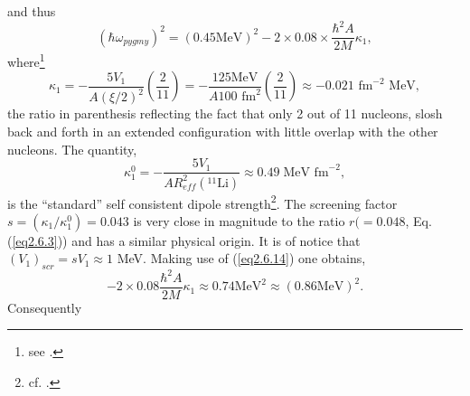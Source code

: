  and thus
\begin{equation}
 (\hbar\omega_{pygmy})^2=(0.45 \text{MeV})^2-2\times 0.08\times\frac{\hbar^2A}{2M}\kappa_1,
\end{equation}
 where\footnote{see \cite{Bortignon:98}.}
\begin{equation}\label{eq2.6.14}
\kappa_1=-\frac{5V_1}{A(\xi/2)^2}\left(\frac{2}{11}\right)=-\frac{125\text{MeV}}{A 100 \text{ fm}^2}\left(\frac{2}{11}\right)\approx -0.021\text{ fm}^{-2}\text{ MeV},
\end{equation}
the ratio in parenthesis reflecting the fact that only 2 out of 11 nucleons, slosh back and forth in an extended configuration with little overlap with the other nucleons. The quantity,
\begin{equation}\label{eq2.6.21}
\kappa_1^0=-\frac{5V_1}{AR^2_{eff}(^{11}\text{Li})}\approx 0.49\; \text{MeV fm}^{-2},
\end{equation}
is the ``standard'' self consistent dipole strength\footnote{cf. \cite{Bohr:75}.}. The screening factor $s=(\kappa_1/\kappa_1^0)=0.043$ is very close in magnitude to the ratio $r(=0.048$, Eq. (\ref{eq2.6.3})) and has a similar physical origin. It is of notice that $(V_1)_{scr}=sV_1\approx 1$ MeV. Making use of (\ref{eq2.6.14})  one obtains,
\begin{equation}
-2\times 0.08\frac{\hbar^2A}{2M}\kappa_1\approx 0.74 \text{MeV}^2\approx (0.86\text{MeV})^2.
\end{equation} 
 Consequently
